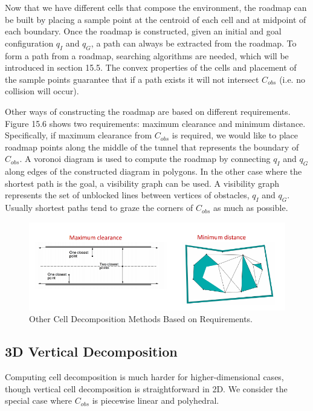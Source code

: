 \documentclass[twoside]{article}
\begin{document}
Now that we have different cells that compose the environment, the roadmap can be built by placing a sample point at the centroid of each cell and at midpoint of each boundary. Once the roadmap is constructed, given an initial and goal configuration $q_I$ and $q_G$, a path can always be extracted from the roadmap. To form a path from a roadmap, searching algorithms are needed, which will be introduced in section 15.5. The convex properties of the cells and placement of the sample points guarantee that if a path exists it will not intersect $C_{obs}$ (i.e. no collision will occur). 

Other ways of constructing the roadmap are based on different requirements. Figure 15.6 shows two requirements: maximum clearance and minimum distance. Specifically, if maximum clearance from $C_{obs}$ is required, we would like to place roadmap points along the middle of the tunnel that represents the boundary of $C_{obs}$. A voronoi diagram is used to compute the roadmap by connecting $q_I$ and $q_G$ along edges of the constructed diagram in polygons. In the other case where the shortest path is the goal, a visibility graph can be used. A visibility graph represents the set of unblocked lines between vertices of obstacles, $q_I$ and $q_G$. Usually shortest paths tend to graze the corners of $C_{obs}$ as much as possible.

\begin{figure}[h]
\begin{center}
\includegraphics{fig15_6.PNG}
\caption{Other Cell Decomposition Methods Based on Requirements.}
\end{center}
\end{figure}

\subsection{3D Vertical Decomposition}
Computing cell decomposition is much harder for higher-dimensional cases, though vertical cell decomposition is straightforward in 2D. We consider the special case where $C_{obs}$ is piecewise linear and polyhedral.
\end{document}

